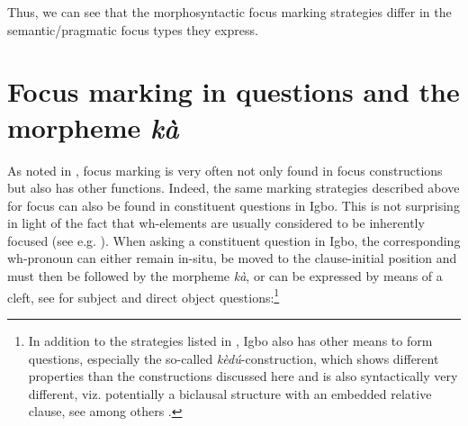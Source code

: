 \documentclass[output=paper,colorlinks,citecolor=brown]{langscibook}
\begin{document}


\enlargethispage{1.0\baselineskip}

Thus, we can see that the morphosyntactic focus marking strategies differ in the semantic\slash pragmatic focus types they express.

\section{Focus marking in questions and the morpheme \textit{kà}}\label{sec:amaechi:3}

As noted in \citet{FiedlerEtAl2010}, focus marking is very often not only found in focus constructions but also has other functions. Indeed, the same marking strategies described above for focus can also be found in constituent questions in Igbo. This is not surprising in light of the fact that wh-elements are usually considered to be inherently focused (see e.g. \citealt{Rochemont1986, Horvath1986, Tuller1986, Beck2006, Haida2007}). When asking a constituent question in Igbo, the corresponding wh-pronoun can either remain in-situ, be moved to the clause-initial position and must then be followed by the morpheme \textit{kà}, or can be expressed by means of a cleft, see  for subject and direct object questions:\footnote{In addition to the strategies listed in , Igbo also has other means to form questions, especially the so-called \textit{kèd{\'u}}-construction, which shows different properties than the constructions discussed here and is also syntactically very different, viz. potentially a biclausal structure with an embedded relative clause, see among others \citet{Ikekeonwu1987, Ndimele1991, Nwankwegu2015, Ogbulogo1995, Amaechi2018}.}
\end{document}
